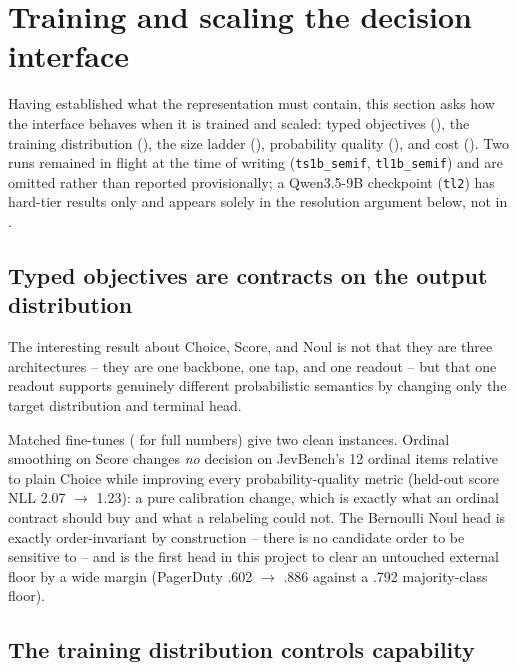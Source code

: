 \section{Training and scaling the decision interface}
\label{sec:train}

Having established what the representation must contain, this section asks how the interface behaves
when it is trained and scaled: typed objectives (), the training distribution
(), the size ladder (), probability quality
(), and cost (). Two runs remained in flight at
the time of writing (\texttt{ts1b\_semif}, \texttt{tl1b\_semif}) and are omitted rather than reported
provisionally; a Qwen3.5-9B checkpoint (\texttt{tl2}) has hard-tier results only and appears solely in
the resolution argument below, not in .

\subsection{Typed objectives are contracts on the output distribution}
\label{sec:train:typed}

The interesting result about Choice, Score, and Noul is not that they are three architectures -- they
are one backbone, one tap, and one readout -- but that one readout supports genuinely different
probabilistic semantics by changing only the target distribution and terminal head.

Matched fine-tunes ( for full numbers) give two clean instances. Ordinal
smoothing on Score changes \emph{no} decision on JevBench's 12 ordinal items relative to plain Choice
while improving every probability-quality metric (held-out score NLL 2.07 $\to$ 1.23): a pure
calibration change, which is exactly what an ordinal contract should buy and what a relabeling could
not. The Bernoulli Noul head is exactly order-invariant by construction -- there is no candidate order
to be sensitive to -- and is the first head in this project to clear an untouched external floor by a
wide margin (PagerDuty .602 $\to$ .886 against a .792 majority-class floor).

\subsection{The training distribution controls capability}
\label{sec:train:mixture}

